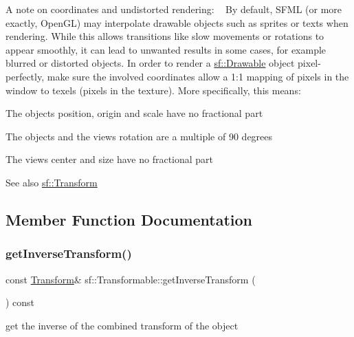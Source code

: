 A note on coordinates and undistorted rendering\+: ~\newline
By default, S\+F\+ML (or more exactly, Open\+GL) may interpolate drawable objects such as sprites or texts when rendering. While this allows transitions like slow movements or rotations to appear smoothly, it can lead to unwanted results in some cases, for example blurred or distorted objects. In order to render a \hyperlink{classsf_1_1_drawable}{sf\+::\+Drawable} object pixel-\/perfectly, make sure the involved coordinates allow a 1\+:1 mapping of pixels in the window to texels (pixels in the texture). More specifically, this means\+:
\begin{DoxyItemize}
\item The object\textquotesingle{}s position, origin and scale have no fractional part
\item The object\textquotesingle{}s and the view\textquotesingle{}s rotation are a multiple of 90 degrees
\item The view\textquotesingle{}s center and size have no fractional part
\end{DoxyItemize}

\begin{DoxySeeAlso}{See also}
\hyperlink{classsf_1_1_transform}{sf\+::\+Transform} 
\end{DoxySeeAlso}


\subsection{Member Function Documentation}
\mbox{\label{classsf_1_1_transformable_ab18b25f51263252ff3811465eb7e9fb1}} 
\subsubsection{\texorpdfstring{get\+Inverse\+Transform()}{getInverseTransform()}}
{\footnotesize\ttfamily const \hyperlink{classsf_1_1_transform}{Transform}\& sf\+::\+Transformable\+::get\+Inverse\+Transform (\begin{DoxyParamCaption}{ }\end{DoxyParamCaption}) const}



get the inverse of the combined transform of the object 

